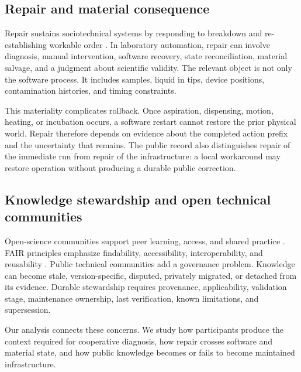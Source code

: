 \subsection{Repair and material consequence}

Repair sustains sociotechnical systems by responding to breakdown and re-establishing workable order \cite{jackson2014repair}. In laboratory automation, repair can involve diagnosis, manual intervention, software recovery, state reconciliation, material salvage, and a judgment about scientific validity. The relevant object is not only the software process. It includes samples, liquid in tips, device positions, contamination histories, and timing constraints.

This materiality complicates rollback. Once aspiration, dispensing, motion, heating, or incubation occurs, a software restart cannot restore the prior physical world. Repair therefore depends on evidence about the completed action prefix and the uncertainty that remains. The public record also distinguishes repair of the immediate run from repair of the infrastructure: a local workaround may restore operation without producing a durable public correction.

\subsection{Knowledge stewardship and open technical communities}

Open-science communities support peer learning, access, and shared practice \cite{eerland2021communities}. FAIR principles emphasize findability, accessibility, interoperability, and reusability \cite{wilkinson2016fair}. Public technical communities add a governance problem. Knowledge can become stale, version-specific, disputed, privately migrated, or detached from its evidence. Durable stewardship requires provenance, applicability, validation stage, maintenance ownership, last verification, known limitations, and supersession.

Our analysis connects these concerns. We study how participants produce the context required for cooperative diagnosis, how repair crosses software and material state, and how public knowledge becomes or fails to become maintained infrastructure.
